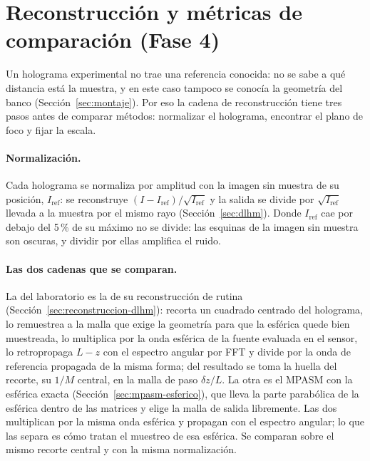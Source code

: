 \section{Reconstrucción y métricas de comparación (Fase 4)}
\label{sec:metricas}

Un holograma experimental no trae una referencia conocida: no se sabe a qué
distancia está la muestra, y en este caso tampoco se conocía la geometría del
banco (Sección~\ref{sec:montaje}). Por eso la cadena de reconstrucción tiene
tres pasos antes de comparar métodos: normalizar el holograma, encontrar el
plano de foco y fijar la escala.

\paragraph{Normalización.} Cada holograma se normaliza por amplitud con la
imagen sin muestra de su posición, $I_\mathrm{ref}$: se reconstruye
$(I - I_\mathrm{ref})/\sqrt{I_\mathrm{ref}}$ y la salida se divide por
$\sqrt{I_\mathrm{ref}}$ llevada a la muestra por el mismo rayo
(Sección~\ref{sec:dlhm}). Donde $I_\mathrm{ref}$ cae por debajo del 5\,\% de
su máximo no se divide: las esquinas de la imagen sin muestra son oscuras, y
dividir por ellas amplifica el ruido.

\paragraph{Las dos cadenas que se comparan.} La del laboratorio es la de su
reconstrucción de rutina (Sección~\ref{sec:reconstruccion-dlhm}): recorta un
cuadrado centrado del holograma, lo remuestrea a la malla que exige la
geometría para que la esférica quede bien muestreada, lo multiplica por la
onda esférica de la fuente evaluada en el sensor, lo retropropaga $L - z$ con
el espectro angular por FFT y divide por la onda de referencia propagada de la
misma forma; del resultado se toma la huella del recorte, su $1/M$ central,
en la malla de paso $\delta z/L$. La otra es el MPASM con la esférica exacta
(Sección~\ref{sec:mpasm-esferico}), que lleva la parte parabólica de la
esférica dentro de las matrices y elige la malla de salida libremente. Las
dos multiplican por la misma onda esférica y propagan con el espectro angular;
lo que las separa es cómo tratan el muestreo de esa esférica. Se comparan
sobre el mismo recorte central y con la misma normalización.

